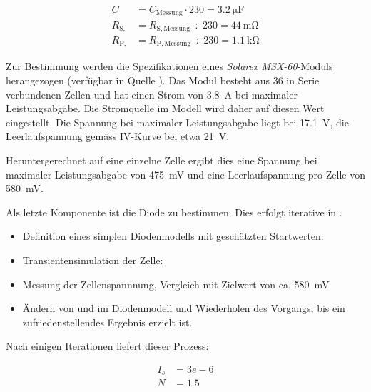 \begin{align}
    C               &= C_{\mathrm{Messung}}    \cdot 230 = \SI{3.2}{\micro\farad} \\
    R_{\mathrm{S,}} &= R_{\mathrm{S, Messung}} \div  230 = \SI{44}{\milli\ohm}    \\
    R_{\mathrm{P,}} &= R_{\mathrm{P, Messung}} \div  230 = \SI{1.1}{\kilo\ohm}
\end{align}

Zur Bestimmung  werden die Spezifikationen eines  \emph{Solarex MSX-60}-Moduls
herangezogen  (verf\"ugbar in  Quelle \cite{ref:solar:bonkoungou}). Das  Modul
besteht  aus  36  in  Serie  verbundenen   Zellen  und  hat  einen  Strom  von
    \SI{3.8}{\ampere}   bei
maximaler  Leistungsabgabe. Die Stromquelle  im Modell  wird daher  auf diesen
Wert  eingestellt.
Die  Spannung  bei   maximaler  Leistungsabgabe  liegt  bei
\SI{17.1}{\volt}, die
Leerlaufspannung gem\"ass IV-Kurve bei etwa \SI{21}{\volt}.

Heruntergerechnet  auf  eine einzelne  Zelle  ergibt  dies eine  Spannung  bei
maximaler Leistungsabgabe von  \SI{475}{\milli\volt} und eine Leerlaufspannung
pro Zelle von \SI{580}{\milli\volt}.

Als  letzte Komponente  ist  die Diode  zu  bestimmen. Dies erfolgt  iterative
in  .

\begin{itemize}
    \item
        Definition eines simplen  Diodenmodells mit gesch\"atzten Startwerten:
    \item
        Transientensimulation der Zelle: 
    \item
        Messung    der   Zellenspannnung,    Vergleich   mit    Zielwert   von
        ca. \SI{580}{\milli\volt}
    \item
        \"Andern von   und   im Diodenmodell  und Wiederholen
        des Vorgangs, bis ein zufriedenstellendes Ergebnis erzielt ist.
\end{itemize}

Nach einigen Iterationen liefert dieser Prozess:

\begin{align}
    \label{eq:cell:diode:IS:N:result}
    I_s &= 3e-6 \\
    N   &= 1.5
\end{align}


